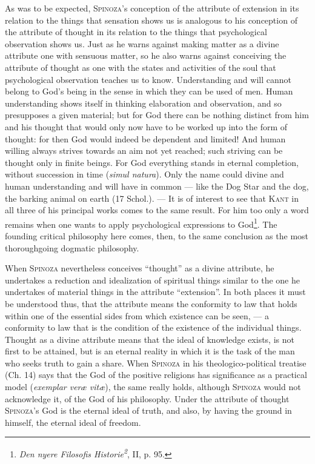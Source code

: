 \documentclass[12pt]{article}
\newcommand{\opage}[1]{\marginnote{\footnotesize\textit{[#1]}}}
\begin{document}
As was to be expected, \textsc{Spinoza}'s conception of the attribute of extension in
its relation to the things that sensation shows us is analogous to his conception of
the attribute of thought in its relation to the things that psychological observation
shows us. Just as he warns against making matter as a divine attribute one with
sensuous matter, so he also warns against conceiving the attribute of thought as one
with the states and activities of the soul that psychological observation teaches us to
know. Understanding and will cannot belong to God's being in the sense in which they can
be used of men. Human understanding shows itself in thinking elaboration and
observation, and so presupposes a given material; but for God there can be nothing
distinct from him and his thought that would only now have to be worked up into the form
of thought: for then God would indeed be dependent and limited! And human willing always
strives towards an aim not yet reached; such striving can be thought only in finite
beings. For God everything stands in eternal completion, without succession in time
(\textit{simul natura}). Only the name could divine and human understanding and will
have in common --- like the Dog Star and the dog, the barking animal on earth (17
Schol.). --- It is of interest to see that \textsc{Kant} in all three of his principal
works comes to the same result. For him too only a word remains when one wants to apply
psychological expressions to God\footnote{\textit{Den nyere Filosofis
Historie\textsuperscript{2}}, II, p. 95.}. The founding critical philosophy here
comes, then, to the same conclusion as the most thoroughgoing dogmatic philosophy.

When \textsc{Spinoza} nevertheless conceives ``thought'' as a divine attribute, he
undertakes a reduction and idealization of spiritual things similar to the one he
undertakes of material things in the attribute ``extension''. In both places it must be
understood thus, that the attribute means the conformity to law that holds within one
of the essential sides from which existence can be seen, --- a conformity to law that is
the condition of the existence of the individual things. Thought as a divine attribute
means that the ideal of knowledge exists, is not first to be attained, but is an eternal
reality in which it is the task of the man who seeks truth to gain a share. When
\textsc{Spinoza} in his theologico-political treatise (Ch. 14) says that the God of the
positive \opage{26}religions has significance as a practical model (\textit{exemplar
veræ vitæ}), the same really holds, although \textsc{Spinoza} would not acknowledge
it, of the God of his philosophy. Under the attribute of thought \textsc{Spinoza}'s God
is the eternal ideal of truth, and also, by having the ground in himself, the eternal
ideal of freedom.
\end{document}
